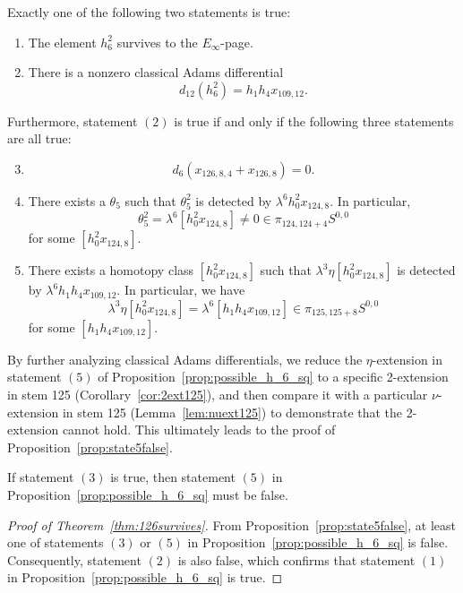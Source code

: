 \documentclass{amsart}
\numberwithin{equation}{section}
\begin{document}
\begin{proposition} \label{prop:possible_h_6_sq}\label{prop:possibleh62}
Exactly one of the following two statements is true:
\begin{enumerate}
    \item The element $h_6^2$ survives to the $E_\infty$-page.
   
    \item There is a nonzero classical Adams differential 
    $$d_{12}(h_6^2) = h_1h_4x_{109,12}.$$
\end{enumerate}
Furthermore, statement $(2)$ is true if and only if the following three statements are all true:
\begin{enumerate} \setcounter{enumi}{2}
    \item \leavevmode\vspace*{-\dimexpr\abovedisplayskip + \baselineskip}  
    $$d_6(x_{126,8,4} + x_{126,8}) = 0.$$
    
    \item There exists a $\theta_5$ such that 
    $\theta_5^2$ is detected by $\lambda^6 h_0^2x_{124,8}$. In particular, 
    $$\theta_5^2 = \lambda^6 [h_0^2x_{124,8}] \neq 0 \in \pi_{124,124+4}S^{0,0}$$
    for some $[h_0^2x_{124,8}]$.

    \item There exists a homotopy class $[h_0^2x_{124,8}]$ such that
    $\lambda^3 \eta [h_0^2x_{124,8}]$ is detected by $\lambda^6 h_1h_4x_{109,12}$. In particular, we have 
    $$\lambda^3 \eta [h_0^2x_{124,8}] = \lambda^6 [h_1h_4x_{109,12}] \in \pi_{125,125+8} S^{0,0}$$
    for some $[h_1h_4x_{109,12}]$.
\end{enumerate}
\end{proposition}

By further analyzing classical Adams differentials, we reduce the $\eta$-extension in statement $(5)$ of Proposition~\ref{prop:possible_h_6_sq} to a specific 2-extension in stem 125 (Corollary~\ref{cor:2ext125}), and then compare it with a particular $\nu$-extension in stem 125 (Lemma~\ref{lem:nuext125}) to demonstrate that the 2-extension cannot hold. This ultimately leads to the proof of Proposition~\ref{prop:state5false}.

\begin{proposition} \label{prop:state5false}
    If statement $(3)$ is true, then statement $(5)$ in Proposition~\ref{prop:possible_h_6_sq} must be false.
\end{proposition}

\begin{proof}[Proof of Theorem~\ref{thm:126survives}]
    From Proposition~\ref{prop:state5false}, at least one of  statements $(3)$ or $(5)$ in Proposition~\ref{prop:possible_h_6_sq} is false. Consequently,  statement $(2)$ is also false, which confirms that statement $(1)$ in Proposition~\ref{prop:possible_h_6_sq} is true.  
\end{proof}
\end{document}
